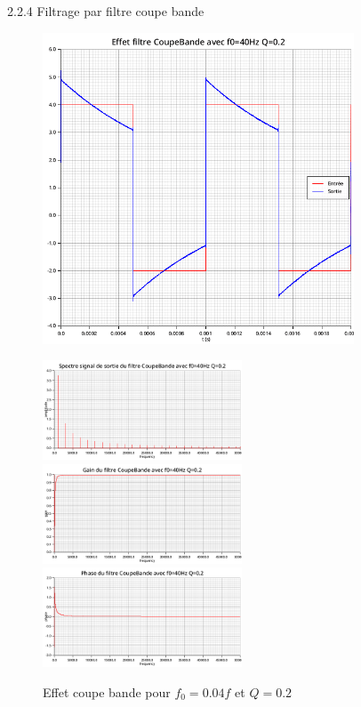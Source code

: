 \documentclass{article}
\newcommand{\expart}[1]
{
    \begin{largeUnderline}#1\end{largeUnderline}\par
}
\begin{document}
\pagebreak

\expart{2.2.4 Filtrage par filtre coupe bande}

\begin{figure}[H]
  \begin{minipage}{0.6\textwidth}
      \centering
      \includegraphics[width=25em]{images/creneau/rejecteur/q=0.2/0.04/signals.png}
  \end{minipage}
  \begin{minipage}{0.3\textwidth}
      \centering
      \includegraphics[width=16em]{images/creneau/rejecteur/q=0.2/0.04/fft_out.png}
      \vfill
      \includegraphics[width=16em]{images/creneau/rejecteur/q=0.2/0.04/gain.png}
      \vfill
      \includegraphics[width=16em]{images/creneau/rejecteur/q=0.2/0.04/phase.png}
  \end{minipage}
  \caption{Effet coupe bande pour $f_0=0.04f$ et $Q=0.2$}
\end{figure}
\end{document}
